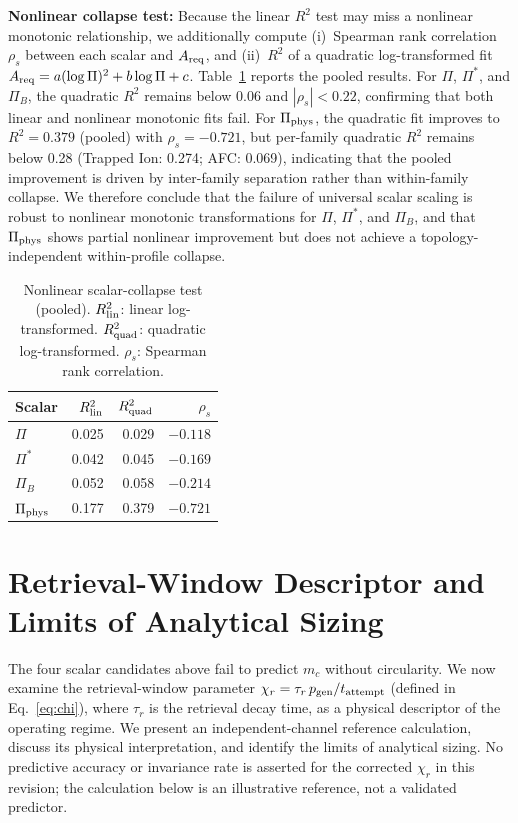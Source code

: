 \documentclass[quantumrep,article,submit,moreauthors]{Definitions/mdpi}
\begin{document}
\textbf{Nonlinear collapse test:} Because the linear $R^2$ test may miss a nonlinear monotonic relationship, we additionally compute (i)~Spearman rank correlation $\rho_s$ between each scalar and $A_{\rm req}$, and (ii)~$R^2$ of a quadratic log-transformed fit $A_{\rm req} = a(\log \Pi)^2 + b\log\Pi + c$. Table~\ref{tab:nonlinear} reports the pooled results. For $\Pi$, $\Pi^*$, and $\Pi_B$, the quadratic $R^2$ remains below 0.06 and $|\rho_s| < 0.22$, confirming that both linear and nonlinear monotonic fits fail. For $\Pi_{\rm phys}$, the quadratic fit improves to $R^2 = 0.379$ (pooled) with $\rho_s = -0.721$, but per-family quadratic $R^2$ remains below 0.28 (Trapped Ion: 0.274; AFC: 0.069), indicating that the pooled improvement is driven by inter-family separation rather than within-family collapse. We therefore conclude that the failure of universal scalar scaling is robust to nonlinear monotonic transformations for $\Pi$, $\Pi^*$, and $\Pi_B$, and that $\Pi_{\rm phys}$ shows partial nonlinear improvement but does not achieve a topology-independent within-profile collapse.

\begin{table}[htbp]
\centering
\caption{Nonlinear scalar-collapse test (pooled). $R^2_{\rm lin}$: linear log-transformed. $R^2_{\rm quad}$: quadratic log-transformed. $\rho_s$: Spearman rank correlation.}
\label{tab:nonlinear}
\begin{tabular}{lrrr}
\toprule
Scalar & $R^2_{\rm lin}$ & $R^2_{\rm quad}$ & $\rho_s$ \\
\midrule
$\Pi$ & 0.025 & 0.029 & $-0.118$ \\
$\Pi^*$ & 0.042 & 0.045 & $-0.169$ \\
$\Pi_B$ & 0.052 & 0.058 & $-0.214$ \\
$\Pi_{\rm phys}$ & 0.177 & 0.379 & $-0.721$ \\
\bottomrule
\end{tabular}
\end{table}

\FloatBarrier

\section{Retrieval-Window Descriptor and Limits of Analytical Sizing}
\label{sec:chi_law}

The four scalar candidates above fail to predict $m_c$ without circularity. We now examine the retrieval-window parameter $\chi_r = \tau_r\, p_{\rm gen} / t_{\rm attempt}$ (defined in Eq.~\ref{eq:chi}), where $\tau_r$ is the retrieval decay time, as a physical descriptor of the operating regime. We present an independent-channel reference calculation, discuss its physical interpretation, and identify the limits of analytical sizing. No predictive accuracy or invariance rate is asserted for the corrected $\chi_r$ in this revision; the calculation below is an illustrative reference, not a validated predictor.
\end{document}
